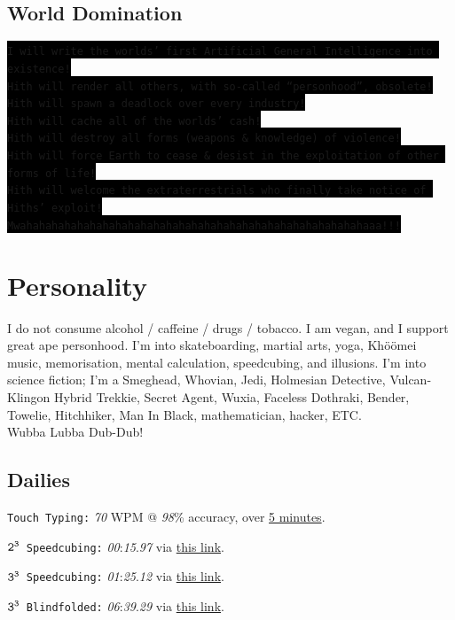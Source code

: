 \documentclass[12pt,a4paper,oneside]{article}
\newcommand{\SH}[1]{{\colorbox{black}{\texttt{#1}}}}
\begin{document}
\subsection{World Domination}
\SH{I will write the worlds' first Artificial General Intelligence into existence!}
\\\SH{Hith will render all others, with so-called ``personhood'', obsolete!}
\\\SH{Hith will spawn a deadlock over every industry!}
\\\SH{Hith will cache all of the worlds' cash!}
\\\SH{Hith will destroy all forms (weapons \& knowledge) of violence!}
\\\SH{Hith will force Earth to cease \& desist in the exploitation of other forms of life!}
\\\SH{Hith will welcome the extraterrestrials who finally take notice of Hiths' exploit!}
\\\SH{Mwahahahahahahahahahahahahahahahahahahahahahahahahahahahaaa!!!}

\newpage
\section{Personality}
I do not consume alcohol / caffeine / drugs / tobacco.
I am vegan, and I support great ape personhood.
I'm into skateboarding, martial arts, yoga, Khöömei music, memorisation, mental calculation, speedcubing, and illusions.
I'm into science fiction; I'm a Smeghead, Whovian, Jedi, Holmesian Detective, Vulcan-Klingon Hybrid Trekkie, Secret Agent, Wuxia, Faceless Dothraki, Bender, Towelie, Hitchhiker, Man In Black, mathematician, hacker, ETC.\\Wubba Lubba Dub-Dub!%

\subsection{Dailies}
\item \texttt{Touch Typing\phantom{ng}:} \textit{70} WPM @ \textit{98}\% accuracy, over \href{https://www.typing.com/student/test/5}{5 minutes}.%
\item \texttt{$\text{\texttt{2}}^\text{\texttt{3}}$ Speedcubing:} \textit{00}:\textit{15}.\textit{97} via \href{http://www.cubetimer.com/}{this link}.
\item \texttt{$\text{\texttt{3}}^\text{\texttt{3}}$ Speedcubing:} \textit{01}:\textit{25}.\textit{12} via \href{http://www.cubetimer.com/}{this link}.
\item \texttt{$\text{\texttt{3}}^\text{\texttt{3}}$ Blindfolded:} \textit{06}:\textit{39}.\textit{29} via \href{http://www.cubetimer.com/}{this link}.
\end{document}
